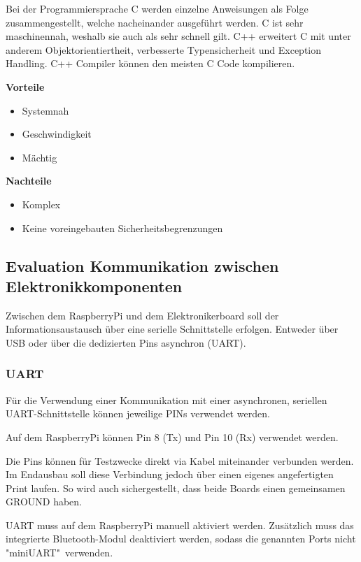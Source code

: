 \documentclass[a4paper]{report}
\begin{document}
Bei der Programmiersprache C werden einzelne Anweisungen als Folge zusammengestellt, welche nacheinander ausgeführt werden. C ist sehr maschinennah, weshalb sie auch als sehr schnell gilt. C++ erweitert C mit unter anderem Objektorientiertheit, verbesserte Typensicherheit und Exception Handling. C++ Compiler können den meisten C Code kompilieren. \parencite{Mishra2015}

\begin{multicols}{2}
	\textbf{Vorteile}
	\begin{itemize}[label={+},noitemsep]
		\item Systemnah
		\item Geschwindigkeit
		\item Mächtig
	\end{itemize}
	\columnbreak
	\textbf{Nachteile}
	\begin{itemize}[label={-},noitemsep]
		\item Komplex
		\item Keine voreingebauten Sicherheitsbegrenzungen
	\end{itemize}
\end{multicols}

\subsection{Evaluation Kommunikation zwischen Elektronikkomponenten}
\label{app:ssec:EvalKomm}
Zwischen dem RaspberryPi und dem Elektronikerboard soll der Informationsaustausch über eine serielle Schnittstelle erfolgen. Entweder über USB oder über die dedizierten Pins asynchron (UART).

\subsubsection{UART}
\label{app:ssec:EvalUART}
Für die Verwendung einer Kommunikation mit einer asynchronen, seriellen UART-Schnittstelle können jeweilige PINs verwendet werden.

Auf dem RaspberryPi können Pin 8 (Tx) und Pin 10 (Rx) verwendet werden.

Die Pins können für Testzwecke direkt via Kabel miteinander verbunden werden. Im Endausbau soll diese Verbindung jedoch über einen eigenes angefertigten Print laufen. So wird auch sichergestellt, dass beide Boards einen gemeinsamen GROUND haben.

UART muss auf dem RaspberryPi manuell aktiviert werden.  Zusätzlich muss das integrierte Bluetooth-Modul deaktiviert werden, sodass die genannten Ports nicht "miniUART"\ verwenden.
\end{document}
